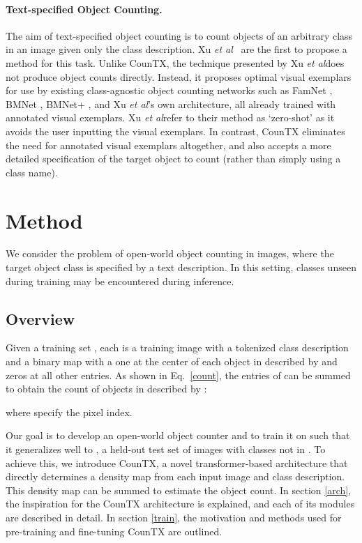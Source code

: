\documentclass{bmvc2k}
\def\etal{\emph{et al}\bmvaOneDot}
\begin{document}
\paragraph{Text-specified Object Counting.}  The aim of text-specified object counting is to count objects of an arbitrary class in an image given only the class description. Xu \etal~\cite{Xu2023ZeroshotOC} are the first to propose a method for this task. Unlike CounTX, the technique presented by Xu \etal does not produce object counts directly. Instead, it proposes optimal visual exemplars for use by existing class-agnostic object counting networks such as FamNet \cite{m_Ranjan-etal-CVPR21}, BMNet \cite{Shi2022RepresentCA}, BMNet+ \cite{Shi2022RepresentCA}, and Xu \etal's own architecture, all already trained with annotated visual exemplars. Xu \etal  refer to their method as `zero-shot' as it avoids the user inputting the visual exemplars. In contrast, CounTX eliminates the need for annotated visual exemplars altogether, and also accepts a more detailed specification of the target object to count (rather than simply using a class name).
 \section{Method}
We consider the problem of open-world object counting in images, where the target object class is specified by a text description. In this setting, classes unseen during training may be encountered during inference.

\subsection{Overview}
Given a training set , each  is a training image with a tokenized class description  and a binary map  with a one at the center of each object in  described by  and zeros at all other entries. As shown in Eq.~\ref{count}, the entries of  can be summed to obtain the count of objects in  described by :

where  specify the pixel index.

Our goal is to develop an open-world object counter and to train it on  such that it generalizes well to , a held-out test set of images with classes not in . To achieve this, we introduce CounTX, a novel transformer-based architecture that directly determines a density map from each input image and class description. This density map can be summed to estimate the object count. In section \ref{arch}, the inspiration for the CounTX architecture is explained, and each of its modules are described in detail. In section \ref{train}, the motivation and methods used for pre-training and fine-tuning CounTX are outlined.
\end{document}
